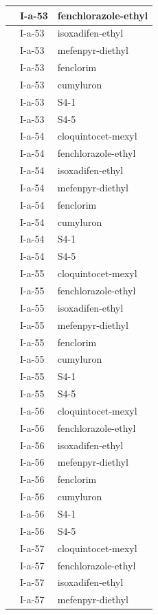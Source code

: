 \documentclass[11pt,a4paper]{article}
\begin{document}
\begin{table}[h]
\begin{tabular}{|l|l|l|}
 & I-a-53 & fenchlorazole-ethyl \\ \hline
 & I-a-53 & isoxadifen-ethyl \\ \hline
 & I-a-53 & mefenpyr-diethyl \\ \hline
 & I-a-53 & fenclorim \\ \hline
 & I-a-53 & cumyluron \\ \hline
 & I-a-53 & S4-1 \\ \hline
 & I-a-53 & S4-5 \\ \hline
 & I-a-54 & cloquintocet-mexyl \\ \hline
 & I-a-54 & fenchlorazole-ethyl \\ \hline
 & I-a-54 & isoxadifen-ethyl \\ \hline
 & I-a-54 & mefenpyr-diethyl \\ \hline
 & I-a-54 & fenclorim \\ \hline
 & I-a-54 & cumyluron \\ \hline
 & I-a-54 & S4-1 \\ \hline
 & I-a-54 & S4-5 \\ \hline
 & I-a-55 & cloquintocet-mexyl \\ \hline
 & I-a-55 & fenchlorazole-ethyl \\ \hline
 & I-a-55 & isoxadifen-ethyl \\ \hline
 & I-a-55 & mefenpyr-diethyl \\ \hline
 & I-a-55 & fenclorim \\ \hline
 & I-a-55 & cumyluron \\ \hline
 & I-a-55 & S4-1 \\ \hline
 & I-a-55 & S4-5 \\ \hline
 & I-a-56 & cloquintocet-mexyl \\ \hline
 & I-a-56 & fenchlorazole-ethyl \\ \hline
 & I-a-56 & isoxadifen-ethyl \\ \hline
 & I-a-56 & mefenpyr-diethyl \\ \hline
 & I-a-56 & fenclorim \\ \hline
 & I-a-56 & cumyluron \\ \hline
 & I-a-56 & S4-1 \\ \hline
 & I-a-56 & S4-5 \\ \hline
 & I-a-57 & cloquintocet-mexyl \\ \hline
 & I-a-57 & fenchlorazole-ethyl \\ \hline
 & I-a-57 & isoxadifen-ethyl \\ \hline
 & I-a-57 & mefenpyr-diethyl \\ \hline

\end{tabular}
\end{table}
\end{document}
